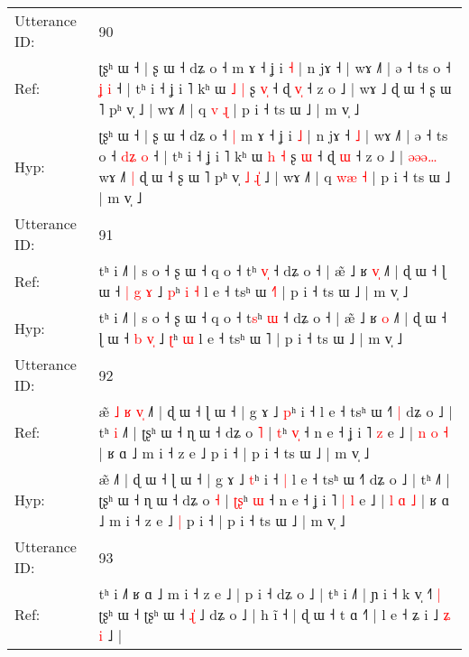 \documentclass[10pt]{article}
\DeclareRobustCommand{\hl}[1]{{\textcolor{red}{#1}}}
\begin{document}
\begin{longtable}{ll}
 \\
\midrule
Utterance ID: & 90 \\
Ref: & ʈʂʰ ɯ ˧ | ʂ ɯ ˧ dʑ o ˧\hl{}\hl{} m ɤ ˧ ʝ i \hl{˧} | n jɤ ˧\hl{}\hl{} | wɤ ˩˥ | ə ˧ ts o ˧ \hl{}\hl{ʝ} \hl{i} ˧ | tʰ i ˧ ʝ i ˥ kʰ ɯ \hl{˩} \hl{|} ʂ \hl{v}\hl{̩} ˧ ɖ \hl{v}\hl{̩} ˧ z o ˩ |\hl{}\hl{}\hl{}\hl{}\hl{} wɤ ˩\hl{}\hl{}\hl{} ɖ ɯ ˧ ʂ ɯ ˥ pʰ v̩\hl{}\hl{}\hl{}\hl{}\hl{} ˩ | wɤ ˩˥ | q \hl{}\hl{v} \hl{ɻ} | p i ˧ ts ɯ ˩ | m v̩ ˩
 \\
Hyp: & ʈʂʰ ɯ ˧ | ʂ ɯ ˧ dʑ o ˧\hl{ }\hl{|} m ɤ ˧ ʝ i \hl{˩} | n jɤ ˧\hl{ }\hl{˩} | wɤ ˩˥ | ə ˧ ts o ˧ \hl{d}\hl{ʑ} \hl{o} ˧ | tʰ i ˧ ʝ i ˥ kʰ ɯ \hl{h} \hl{˧} ʂ \hl{}\hl{ɯ} ˧ ɖ \hl{}\hl{ɯ} ˧ z o ˩ |\hl{ }\hl{ə}\hl{ə}\hl{ə}\hl{…} wɤ ˩\hl{˥}\hl{ }\hl{|} ɖ ɯ ˧ ʂ ɯ ˥ pʰ v̩\hl{ }\hl{˩}\hl{ }\hl{ɻ}\hl{̍} ˩ | wɤ ˩˥ | q \hl{w}\hl{æ} \hl{˧} | p i ˧ ts ɯ ˩ | m v̩ ˩
 \\
\midrule
Utterance ID: & 91 \\
Ref: & tʰ i ˩˥ | s o ˧ ʂ ɯ ˧ q o ˧ t\hl{}ʰ \hl{v}\hl{̩} ˧ dʑ o ˧ | æ̃ ˩ ʁ \hl{v}\hl{̩} ˩˥ | ɖ ɯ ˧ ɭ ɯ ˧ \hl{|} \hl{g}\hl{ }\hl{ɤ} ˩ \hl{p}ʰ\hl{ }\hl{i} \hl{˧} l e ˧ tsʰ ɯ \hl{˧}˥ | p i ˧ ts ɯ ˩ | m v̩ ˩
 \\
Hyp: & tʰ i ˩˥ | s o ˧ ʂ ɯ ˧ q o ˧ t\hl{s}ʰ \hl{}\hl{ɯ} ˧ dʑ o ˧ | æ̃ ˩ ʁ \hl{}\hl{o} ˩˥ | ɖ ɯ ˧ ɭ ɯ ˧ \hl{b} \hl{}\hl{v}\hl{̩} ˩ \hl{ʈ}ʰ\hl{}\hl{} \hl{ɯ} l e ˧ tsʰ ɯ \hl{}˥ | p i ˧ ts ɯ ˩ | m v̩ ˩
 \\
\midrule
Utterance ID: & 92 \\
Ref: & æ̃\hl{ }\hl{˩}\hl{ }\hl{ʁ}\hl{ }\hl{v}\hl{̩} ˩˥ | ɖ ɯ ˧ ɭ ɯ ˧ | g ɤ ˩ \hl{p}ʰ i ˧\hl{}\hl{} l e ˧ tsʰ ɯ ˧˥\hl{ }\hl{|} dʑ o ˩ | tʰ\hl{ }\hl{i} ˩˥ | ʈʂʰ ɯ ˧ ɳ ɯ ˧ dʑ o \hl{˥} | \hl{}\hl{t}ʰ \hl{v}\hl{̩} ˧ n e ˧ ʝ i ˥\hl{}\hl{} \hl{z} e ˩ | \hl{n} \hl{o} \hl{˧} | ʁ ɑ ˩ m i ˧ z e ˩\hl{}\hl{} p i ˧ | p i ˧ ts ɯ ˩ | m v̩ ˩
 \\
Hyp: & æ̃\hl{}\hl{}\hl{}\hl{}\hl{}\hl{}\hl{} ˩˥ | ɖ ɯ ˧ ɭ ɯ ˧ | g ɤ ˩ \hl{t}ʰ i ˧\hl{ }\hl{|} l e ˧ tsʰ ɯ ˧˥\hl{}\hl{} dʑ o ˩ | tʰ\hl{}\hl{} ˩˥ | ʈʂʰ ɯ ˧ ɳ ɯ ˧ dʑ o \hl{˧} | \hl{ʈ}\hl{ʂ}ʰ \hl{}\hl{ɯ} ˧ n e ˧ ʝ i ˥\hl{ }\hl{|} \hl{l} e ˩ | \hl{l} \hl{ɑ} \hl{˩} | ʁ ɑ ˩ m i ˧ z e ˩\hl{ }\hl{|} p i ˧ | p i ˧ ts ɯ ˩ | m v̩ ˩
 \\
\midrule
Utterance ID: & 93 \\
Ref: & tʰ i ˩˥\hl{}\hl{} ʁ ɑ ˩ m i ˧ z e ˩ | p i ˧ dʑ o ˩ | tʰ i ˩˥ | ɲ i ˧ k v̩ ˧\hl{}\hl{}\hl{}\hl{}\hl{˥} \hl{|} ʈʂʰ ɯ ˧\hl{}\hl{} ʈʂʰ ɯ ˧\hl{ }\hl{ɻ}\hl{̍} ˩ dʑ o ˩ | h ĩ ˧ | ɖ ɯ ˧ t ɑ ˧˥ | l e ˧ ʑ i ˩ \hl{ʑ} \hl{i} ˩ |
 \\

\end{longtable}
\end{document}

